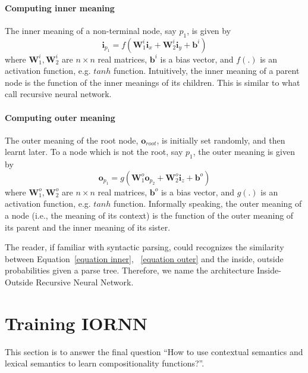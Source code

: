 \documentclass[11pt]{article}
\begin{document}
\paragraph{Computing inner meaning} The inner meaning of a non-terminal node, say $p_1$, is given by
\begin{equation}
	\mathbf{i}_{p_1} = f(\mathbf{W}_1^i \mathbf{i}_{x} + \mathbf{W}_2^i \mathbf{i}_{y} + \mathbf{b}^i)
	\label{equation inner}
\end{equation}
where $\mathbf{W}_1^i, \mathbf{W}_2^i$ are $n \times n$ real matrices, 
$\mathbf{b}^i$ is a bias vector, and $f(.)$ is an activation function, e.g. $tanh$ 
function. Intuitively, the inner meaning of a parent node is the function of the inner meanings 
of its children. This is similar to what \cite{socher_learning_2010} call recursive neural network.

\paragraph{Computing outer meaning} The outer meaning of the root node, $\mathbf{o}_{root}$, is initially 
set randomly, and then learnt later. To a node which is not the root, say $p_1$, the outer meaning is given by
\begin{equation}
	\mathbf{o}_{p_1} = g(\mathbf{W}_1^o \mathbf{o}_{p_2} + \mathbf{W}_2^o \mathbf{i}_{z} + \mathbf{b}^o)
	\label{equation outer}
\end{equation}
where $\mathbf{W}_1^o, \mathbf{W}_2^o$ are $n \times n$ real matrices, 
$\mathbf{b}^o$ is a bias vector, and $g(.)$ is an activation function, e.g. $tanh$ 
function. Informally speaking, the outer meaning of a node (i.e., the meaning of 
its context) is the function of the outer meaning of its parent and the inner meaning 
of its sister. 

The reader, if familiar with syntactic parsing, could recognizes the similarity between 
Equation~\ref{equation inner}, ~\ref{equation outer}
and the inside, outside probabilities given a parse tree.
Therefore, we name the architecture Inside-Outside Recursive Neural Network.


\section{Training IORNN}
\label{section train iornn}

This section is to answer the final question ``How to use contextual semantics and 
lexical semantics to learn compositionality functions?''. 
\end{document}
